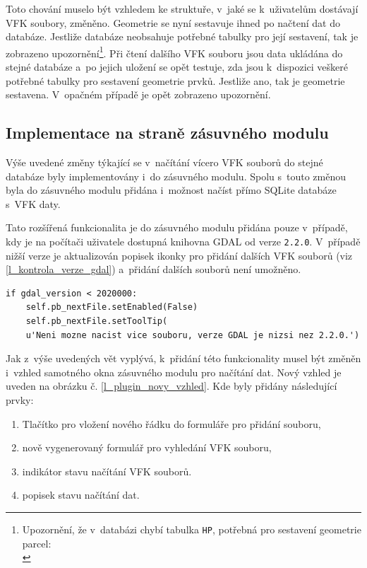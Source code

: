 \documentclass[a4paper,12pt,oneside]{book}
\begin{document}
Toto chování muselo být vzhledem ke struktuře, v~jaké se k~uživatelům
dostávají VFK soubory, změněno. Geometrie se nyní sestavuje ihned po
načtení dat do databáze. Jestliže databáze neobsahuje potřebné tabulky
pro její sestavení, tak je zobrazeno upozornění\footnote{Upozornění,
  že v~databázi chybí tabulka \texttt{HP}, potřebná pro sestavení
  geometrie parcel:\\}. Při čtení dalšího VFK souboru jsou data
ukládána do stejné databáze a~po jejich uložení se opět testuje, zda
jsou k~dispozici veškeré potřebné tabulky pro sestavení geometrie
prvků. Jestliže ano, tak je geometrie sestavena. V~opačném případě je
opět zobrazeno upozornění.

\subsection{Implementace na straně zásuvného modulu}
Výše uvedené změny týkající se v~načítání vícero VFK souborů do stejné
databáze byly implementovány i~do zásuvného modulu. Spolu s~touto
změnou byla do zásuvného modulu přidána i~možnost načíst přímo SQLite
databáze s~VFK daty.

Tato rozšířená funkcionalita je do zásuvného modulu přidána pouze
v~případě, kdy je na počítači uživatele dostupná knihovna GDAL od
verze \texttt{2.2.0}. V~případě nižší verze je aktualizován popisek
ikonky pro přidání dalších VFK souborů (viz
\ref{l_kontrola_verze_gdal}) a~přidání dalších souborů není umožněno.

\begin{lstlisting}[style=python, 
		    caption={Kontrola verze GDAL na straně VFK pluginu}, 
		    label=l_kontrola_verze_gdal]
if gdal_version < 2020000:
    self.pb_nextFile.setEnabled(False)
    self.pb_nextFile.setToolTip(
	u'Neni mozne nacist vice souboru, verze GDAL je nizsi nez 2.2.0.')
\end{lstlisting}

Jak z~výše uvedených vět vyplývá, k~přidání této funkcionality musel
být změněn i~vzhled samotného okna zásuvného modulu pro načítání
dat. Nový vzhled je uveden na obrázku
č. \ref{l_plugin_novy_vzhled}. Kde byly přidány následující prvky:

\begin{enumerate}
 \item Tlačítko pro vložení nového řádku do formuláře pro přidání souboru,
 \item nově vygenerovaný formulář pro vyhledání VFK souboru,
 \item indikátor stavu načítání VFK souborů.
 \item popisek stavu načítání dat.
\end{enumerate}
\end{document}
